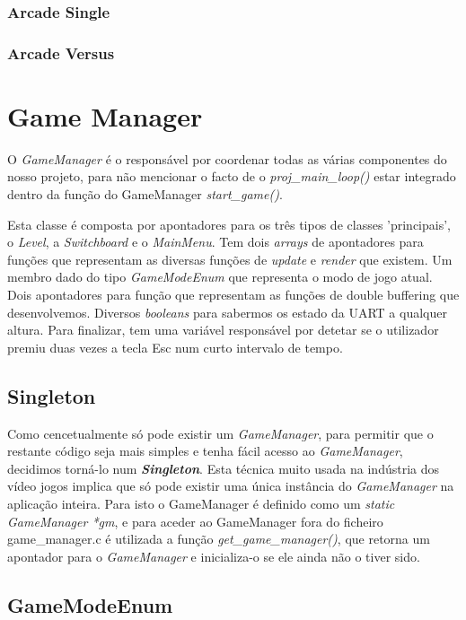 \documentclass{report}
\begin{document}
\subsubsection{Arcade Single}

\subsubsection{Arcade Versus}

\section{Game Manager}

O \textit{GameManager} é o responsável por coordenar todas as várias componentes do nosso projeto, para não mencionar o facto de o \textit{proj\_main\_loop()} estar integrado dentro da função do GameManager \textit{start\_game()}.

Esta classe é composta por apontadores para os três tipos de classes 'principais', o \textit{Level}, a \textit{Switchboard} e o \textit{MainMenu}. Tem dois \textit{arrays} de apontadores para funções que representam as diversas funções de \textit{update} e \textit{render} que existem. Um membro dado do tipo \textit{GameModeEnum} que representa o modo de jogo atual. Dois apontadores para função que representam as funções de double buffering que desenvolvemos. Diversos \textit{booleans} para sabermos os estado da UART a qualquer altura. Para finalizar, tem uma variável responsável por detetar se o utilizador premiu duas vezes a tecla Esc num curto intervalo de tempo.

\subsection{Singleton}

Como cencetualmente só pode existir um \textit{GameManager}, para permitir que o restante código seja mais simples e tenha fácil acesso ao \textit{GameManager}, decidimos torná-lo num \textbf{\textit{Singleton}}. Esta técnica muito usada na indústria dos vídeo jogos implica que só pode existir uma única instância do \textit{GameManager} na aplicação inteira. Para isto o GameManager é definido como um \textit{static GameManager *gm}, e para aceder ao GameManager fora do ficheiro game\_manager.c é utilizada a função \textit{get\_game\_manager()}, que retorna um apontador para o \textit{GameManager} e inicializa-o se ele ainda não o tiver sido.

\subsection{GameModeEnum}
\end{document}
